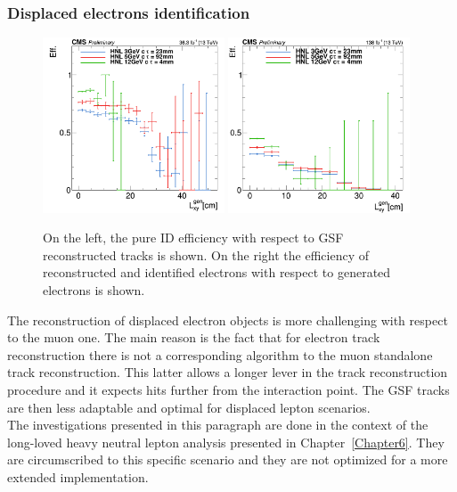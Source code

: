 \subsubsection{Displaced electrons
  identification}\label{sec:c2dispele}
\begin{figure}[h]
\centering
  \includegraphics[width=0.48\textwidth]{Figures/c2/_e_l2id_Lxy_eff.png}
  \includegraphics[width=0.48\textwidth]{Figures/c2/el_l2full_Lxy_eff.png}
  \caption{On the left, the pure ID efficiency with
    respect to GSF reconstructed tracks is shown. On the right the efficiency
    of reconstructed and identified electrons with
    respect to generated electrons is shown. \basile}
  \label{fig:basileele}
\end{figure}

The reconstruction of displaced electron objects is more challenging
with respect to the muon one. 
The main reason is the fact that for electron track reconstruction
there is not a corresponding algorithm to the muon standalone track
reconstruction. This latter allows a longer lever in the track
reconstruction procedure and it expects hits
further from the interaction point. The GSF tracks are then less
adaptable and optimal for displaced lepton scenarios.\\

The investigations presented in this paragraph are done in the context
of the long-loved heavy neutral lepton analysis presented in
Chapter~\ref{Chapter6}. They are circumscribed
to this specific scenario and they are not optimized for a more extended
implementation.  

